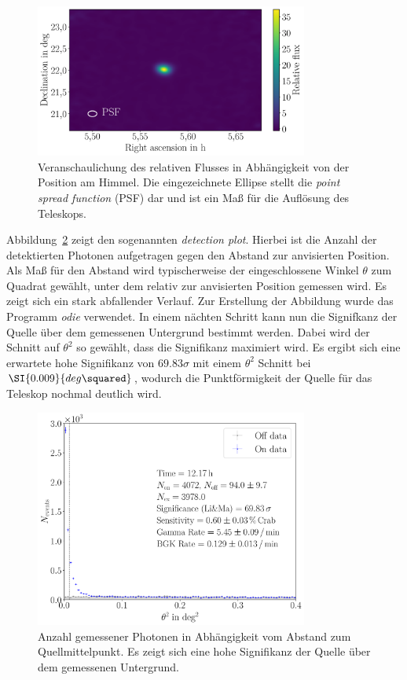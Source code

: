 \begin{figure}[H]
  \centering
  \includegraphics[width=0.8\textwidth]{figures/caspar_flux_skymap.pdf}
  \caption{Veranschaulichung des relativen Flusses in Abhängigkeit von der
  Position am Himmel. Die eingezeichnete Ellipse stellt die
  \textit{point spread function} (PSF) dar und ist ein Maß für die Auflösung des
  Teleskops.}
  \label{fig:skyplot}
\end{figure}

Abbildung~\ref{fig:detectionplot} zeigt den sogenannten \textit{detection plot}.
Hierbei ist die Anzahl der detektierten Photonen aufgetragen gegen den Abstand
zur anvisierten Position. Als Maß für den Abstand wird typischerweise der
eingeschlossene Winkel $\theta$ zum Quadrat gewählt, unter dem relativ zur
anvisierten Position gemessen wird. Es zeigt sich ein stark abfallender Verlauf.
Zur Erstellung der Abbildung wurde das Programm \textit{odie} verwendet. In
einem nächten Schritt kann nun die Signifkanz der Quelle über dem gemessenen
Untergrund bestimmt werden. Dabei wird der Schnitt auf $\theta^2$ so gewählt,
dass die Signifikanz maximiert wird. Es ergibt sich eine erwartete hohe
Signifikanz von $\num{69.83}\sigma$ mit einem $\theta^2$ Schnitt bei
$\SI{0.009}{deg\squared}$, wodurch die Punktförmigkeit der Quelle für das
Teleskop nochmal deutlich wird.

\begin{figure}[H]
  \centering
  \includegraphics[width=0.8\textwidth]{figures/odie_thetasquared.pdf}
  \caption{Anzahl gemessener Photonen in Abhängigkeit vom Abstand zum
  Quellmittelpunkt. Es zeigt sich eine hohe Signifikanz der Quelle über dem
  gemessenen Untergrund.}
  \label{fig:detectionplot}
\end{figure}

